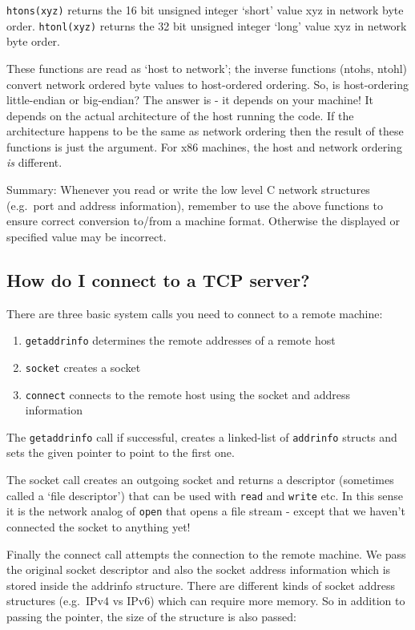 \texttt{htons(xyz)} returns the 16 bit unsigned integer `short' value xyz in network byte order. \texttt{htonl(xyz)} returns the 32 bit unsigned integer `long' value xyz in network byte order.

These functions are read as `host to network'; the inverse functions (ntohs, ntohl) convert network ordered byte values to host-ordered ordering. So, is host-ordering little-endian or big-endian? The answer is - it depends on your machine! It depends on the actual architecture of the host running the code. If the architecture happens to be the same as network ordering then the result of these functions is just the argument. For x86 machines, the host and network ordering \emph{is} different.

Summary: Whenever you read or write the low level C network structures (e.g.~port and address information), remember to use the above functions to ensure correct conversion to/from a machine format. Otherwise the displayed or specified value may be incorrect.

\subsection{How do I connect to a TCP server?}

There are three basic system calls you need to connect to a remote machine:

\begin{enumerate}
\item \texttt{getaddrinfo} determines the remote addresses of a remote host
\item \texttt{socket} creates a socket
\item \texttt{connect} connects to the remote host using the socket and address information
\end{enumerate}

The \texttt{getaddrinfo} call if successful, creates a linked-list of \texttt{addrinfo} structs and sets the given pointer to point to the first one.

The socket call creates an outgoing socket and returns a descriptor (sometimes called a `file descriptor') that can be used with \texttt{read} and \texttt{write} etc. In this sense it is the network analog of \texttt{open} that opens a file stream - except that we haven't connected the socket to anything yet!

Finally the connect call attempts the connection to the remote machine. We pass the original socket descriptor and also the socket address information which is stored inside the addrinfo structure. There are different kinds of socket address structures (e.g.~IPv4 vs IPv6) which can require more memory. So in addition to passing the pointer, the size of the structure is also passed:

